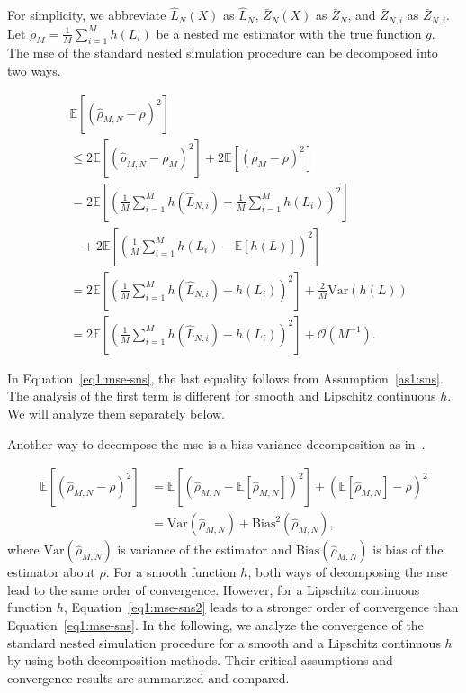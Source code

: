 For simplicity, we abbreviate $\hat{L}_N(X)$ as $\hat{L}_N$, $\bar{Z}_N(X)$ as $\bar{Z}_N$, and $\bar{Z}_{N, i}$ as $\bar{Z}_{N, i}$.
Let $\rho_M = \frac{1}{M} \sum_{i=1}^M h(L_i)$ be a nested \gls{mc} estimator with the true function $g$.
The \gls{mse} of the standard nested simulation procedure can be decomposed into two ways.

\begin{align}\label{eq1:mse-sns}
    & \mathbb{E} \left[ \left( \hat{\rho}_{M, N} - \rho \right)^2 \right] \nonumber \\
    & \leq 2 \mathbb{E} \left[ \left( \hat{\rho}_{M, N} - \rho_M \right)^2 \right] 
            + 2  \mathbb{E} \left[ \left(\rho_M - \rho \right)^2 \right]  \nonumber \\
    & = 2 \mathbb{E} \left[  \left( \frac{1}{M} \sum_{i=1}^M h\left( \hat{L}_{N, i} \right) -  \frac{1}{M} \sum_{i=1}^M h\left(L_i \right)  \right)^2\right] \nonumber \\
    & ~~~~ + 2  \mathbb{E} \left[ \left(\frac{1}{M} \sum_{i=1}^M h\left(L_i \right) - \mathbb{E}\left[ h(L)\right] \right)^2 \right]  \nonumber \\
    & = 2 \mathbb{E} \left[  \left( \frac{1}{M} \sum_{i=1}^M h\left( \hat{L}_{N, i} \right) -  h\left(L_i \right)  \right)^2\right] + \frac{2}{M} \text{Var}(h(L)) \nonumber \\
    & = 2 \mathbb{E} \left[  \left( \frac{1}{M} \sum_{i=1}^M h\left( \hat{L}_{N, i} \right) -  h\left(L_i \right)  \right)^2\right] + \mathcal{O}(M^{-1}).
\end{align}

In Equation~\eqref{eq1:mse-sns}, the last equality follows from Assumption~\ref{as1:sns}.
The analysis of the first term is different for smooth and Lipschitz continuous $h$. 
We will analyze them separately below.

Another way to decompose the \gls{mse} is a bias-variance decomposition as in~\cite{gordy2010nested}.

\begin{align}\label{eq1:mse-sns2}
    \mathbb{E} \left[ \left( \hat{\rho}_{M, N} - \rho \right)^2 \right] 
    & = \mathbb{E} \left[ \left( \hat{\rho}_{M, N} - \mathbb{E} \left[ \hat{\rho}_{M, N} \right] \right)^2 \right] + \left( \mathbb{E} \left[ \hat{\rho}_{M, N} \right] - \rho \right)^2 \nonumber \\
    & = \text{Var}(\hat{\rho}_{M, N}) + \text{Bias}^2(\hat{\rho}_{M, N}),
\end{align}
where $\text{Var}(\hat{\rho}_{M, N})$ is variance of the estimator and $\text{Bias}(\hat{\rho}_{M, N})$ is bias of the estimator about $\rho$.
For a smooth function $h$, both ways of decomposing the \gls{mse} lead to the same order of convergence.
However, for a Lipschitz continuous function $h$, Equation~\eqref{eq1:mse-sns2} leads to a stronger order of convergence than Equation~\eqref{eq1:mse-sns}.
In the following, we analyze the convergence of the standard nested simulation procedure for a smooth and a Lipschitz continuous $h$ by using both decomposition methods.
Their critical assumptions and convergence results are summarized and compared.

